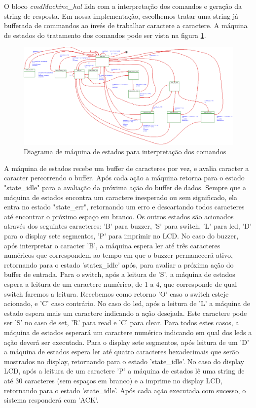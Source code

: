 \documentclass{article}
\begin{document}
O bloco \textit{cmdMachine\_hal} lida com a interpretação dos comandos e geração da string de resposta. Em nossa implementação, escolhemos tratar uma string já bufferada de commandos ao invés de trabalhar caractere a caractere. A máquina de estados do tratamento dos comandos pode ser vista na figura \ref{fig:estados}.

\begin{figure}[H]
	\centering
	\includegraphics[width=1.5\linewidth, center]{estados}
	\caption{Diagrama de máquina de estados para interpretação dos comandos}
	\label{fig:estados}
\end{figure}

A máquina de estados recebe um buffer de caracteres por vez, e avalia caracter a caracter percorrendo o buffer. Após cada ação a máquina retorna para o estado "state\_idle" para a avaliação da próxima ação do buffer de dados. Sempre que a máquina de estados encontra um caractere inesperado ou sem significado, ela entra no estado "state\_err", retornando um erro e descartando todos caracteres até encontrar o próximo espaço em branco. Os outros estados são acionados através dos seguintes caracteres: 'B' para buzzer, 'S' para switch, 'L' para led, 'D' para o display sete segmentos, 'P' para imprimir no LCD.
No caso do buzzer,  após interpretar o caracter 'B', a máquina espera ler até três caracteres numéricos que correspondem ao tempo em que o buzzer permanecerá ativo, retornando para o estado 'statez\_idle' após, para avaliar a próxima ação do buffer de entrada.
Para o switch, após a leitura de 'S', a máquina de estados espera a leitura de um caractere numérico, de 1 a 4, que corresponde de qual switch faremos a leitura. Recebemos como retorno 'O' caso o switch esteje acionado, e 'C' caso contrário.
No caso do led, após a leitura de 'L' a máquina de estado espera mais um caractere indicando a ação desejada. Este caractere pode ser 'S' no caso de set, 'R' para read e 'C' para clear. Para todos estes casos, a máquina de estados esperará um caractere numérico indicando em qual dos leds a ação deverá ser executada.
Para o display sete segmentos, após leitura de um 'D' a máquina de estados espera ler até quatro caracteres hexadecimais que serão mostrados no display, retornando para o estado 'state\_idle'.
No caso do display LCD, após a leitura de um caractere 'P' a máquina de estados lê uma string de até 30 caracteres (sem espaços em branco) e a imprime no display LCD, retornando para o estado 'state\_idle'.
Após cada ação executada com sucesso, o sistema responderá com 'ACK'.
\end{document}
